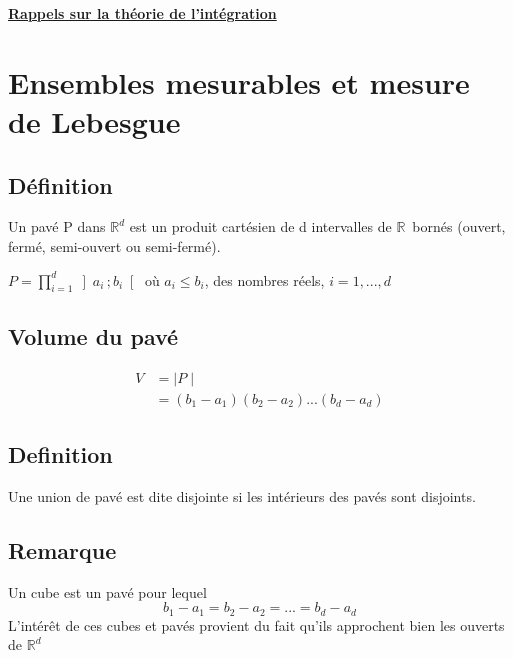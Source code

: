 \documentclass[12pt]{article}
\let\big\mathbb
\newcommand{\R}{\ensuremath{\big{R}}}
\newcommand{\Rn}[2]{\ensuremath{\big{R}^{#1}_{#2}}}
\begin{document}
    \begin{center}
        \begin{LARGE}
        \underline{\textbf{Rappels sur la théorie de l'intégration}}\\
        \end{LARGE}
    \end{center}
	
	\section{Ensembles mesurables et mesure de Lebesgue}
		\subsection*{Définition}
		Un pavé P dans \Rn{d}{} est un produit cartésien de d intervalles de \R \, bornés (ouvert, fermé, semi-ouvert ou semi-fermé).
		\begin{center}
		$ P = \prod^{d}_{i=1}\left]a_{i}\, ; b_{i} \right[ $ où $ a_{i} \leq b_{i}$, des nombres réels, $i = 1, ..., d$
		\end{center}
		
		\subsection*{Volume du pavé}
		\noindent \begin{align*}
		V 	&= \mid P\mid \\
			&= (b_{1} - a_{1})(b_{2} - a_{2})...(b_{d} - a_{d})
		\end{align*}
		
		\subsection*{Definition}
		Une union de pavé est dite disjointe si les intérieurs des pavés sont disjoints.
		
		\subsection*{Remarque}
		Un cube est un pavé pour lequel $$ b_{1} - a_{1} = b_{2} - a_{2} = ... = b_{d} - a_{d} $$ L'intérêt de ces cubes et pavés provient du fait qu'ils approchent bien les ouverts de \Rn{d}{}
\end{document}
